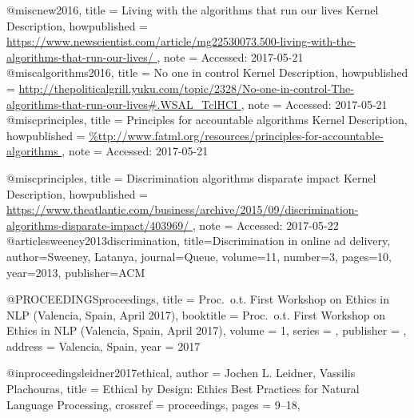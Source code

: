 
@misc{new2016,
  title = {{Living with the algorithms that run our lives} Kernel Description},
  howpublished = {\url{https://www.newscientist.com/article/mg22530073.500-living-with-the-algorithms-that-run-our-lives/
}},
  note = {Accessed: 2017-05-21}
}
@misc{algorithms2016,
  title = {{No one in control} Kernel Description},
  howpublished = {\url{http://thepoliticalgrill.yuku.com/topic/2328/No-one-in-control-The-algorithms-that-run-our-lives#.WSAL_TclHCI
}},
  note = {Accessed: 2017-05-21}
}
@misc{principles,
  title = {{Principles for accountable algorithms} Kernel Description},
  howpublished = {\url{%
}},
  note = {Accessed: 2017-05-21}
}

@misc{principles,
  title = {{Discrimination algorithms disparate impact} Kernel Description},
  howpublished = {\url{https://www.theatlantic.com/business/archive/2015/09/discrimination-algorithms-disparate-impact/403969/
}},
  note = {Accessed: 2017-05-22}
}
@article{sweeney2013discrimination,
  title={Discrimination in online ad delivery},
  author={Sweeney, Latanya},
  journal={Queue},
  volume={11},
  number={3},
  pages={10},
  year={2013},
  publisher={ACM}
}

@PROCEEDINGS{proceedings,
  title = {Proc.\ o.t. First Workshop on Ethics in NLP
      (Valencia, Spain, April 2017)},
  booktitle = {Proc.\ o.t. First Workshop on Ethics in NLP
      (Valencia, Spain, April 2017)},
  volume = 1,
  series = {},
  publisher = {},
  address = {Valencia, Spain},
  year = {2017}
}

@inproceedings{leidner2017ethical,
  author =       {Jochen L. Leidner, Vassilis Plachouras},
  title =        {Ethical by Design: Ethics Best Practices for Natural Language Processing},
  crossref =     {proceedings},
  pages =        {9--18},
}


